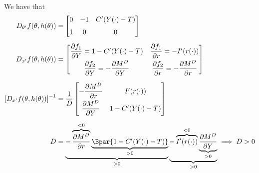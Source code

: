 \documentclass{article}
\begin{document}
We have that
\begin{align*}
  D_{\theta^\prime} f(\theta, h(\theta))
  & =
  \left[\begin{matrix}
      0
    & -1
    & C^\prime(Y(\cdot) - T) \\[6pt]
      1
    & 0
    & 0
  \end{matrix}\right] \\[6pt]
  D_{x^\prime} f(\theta, h(\theta))
  & =
  \left[\begin{matrix}
      \dfrac{\partial f_1}{\partial Y} = 1 - C^\prime(Y(\cdot) - T)
    & \dfrac{\partial f_1}{\partial r} = -I^\prime(r(\cdot)) \\[6pt]
      \dfrac{\partial f_2}{\partial Y} = -\dfrac{\partial M^D}{\partial Y}
    & \dfrac{\partial f_2}{\partial r} = -\dfrac{\partial M^D}{\partial r}
  \end{matrix}\right] \\[6pt]
  \left[D_{x^\prime} f(\theta, h(\theta))\right]^{-1}
  & =
  \dfrac{1}{D}
  \left[\begin{matrix}
      - \dfrac{\partial M^D}{\partial r}
    & I^\prime(r(\cdot)) \\[6pt]
      \dfrac{\partial M^D}{\partial Y}
    & 1 - C^\prime(Y(\cdot) - T)
  \end{matrix}\right] \\[6pt]
  D & =
  \underbrace{
   - \overbrace{\dfrac{\partial M^D}{\partial r}}^{< 0}
     \underbrace{\Bpar{1 - C^\prime(Y(\cdot) - T)}}_{> 0}
   }_{> 0}
  \underbrace{
   - \overbrace{I^\prime(r(\cdot))}^{< 0}
     \underbrace{\dfrac{\partial M^D}{\partial Y}}_{> 0}
   }_{> 0}
   \implies D > 0
\end{align*}
\end{document}
